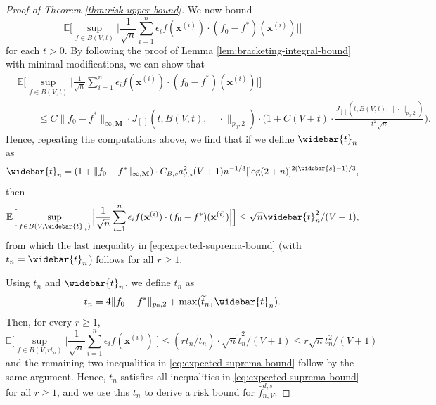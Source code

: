 \documentclass[10pt]{article}
\newcommand{\E}{{\mathbb E}}
\newcommand{\lsefstinf}{{\hat{f}^{d, s}_{n, V}}}
\newcommand{\xbf}{{\mathbf{x}}}
\newcommand{\Mbf}{{\mathbf{M}}}
\begin{document}
\begin{proof}[Proof of Theorem \ref{thm:risk-upper-bound}]
We now bound 
\begin{equation*}
    \E\Big[ \sup_{f \in B(V, t)} \Big| \frac{1}{\sqrt{n}} 
    \sum_{i = 1}^{n} \epsilon_i f(\xbf^{(i)})\cdot 
    (f_0 - f^*)(\xbf^{(i)})\Big|\Big] 
\end{equation*}
for each $t > 0$. By following the proof of Lemma \ref{lem:bracketing-integral-bound} 
with minimal modifications, we can show that
\begin{equation*}
\begin{aligned}
    &\E\Big[ \sup_{f \in B(V, t)} \Big| \frac{1}{\sqrt{n}} 
    \sum_{i = 1}^{n} \epsilon_i f(\xbf^{(i)})\cdot 
    (f_0 - f^*)(\xbf^{(i)})\Big|\Big] \\
    &\qquad\le C \|f_0 - f^*\|_{\infty, \Mbf} \cdot 
    J_{[ \ ]}(t, B(V, t), \| \cdot \|_{p_0, 2}) 
    \cdot \Big(1 + C(V + t) \cdot 
    \frac{J_{[ \ ]}(t, B(V, t), \| \cdot \|_{p_0, 2})}{t^2 \sqrt{n}}\Big).
\end{aligned}
\end{equation*}
Hence, repeating the computations above, we find that if we define  
$\widebar{t}_n$ as
\begin{equation*}
    \widebar{t}_n 
    = (1 + \|f_0 - f^*\|_{\infty, \Mbf}) 
    \cdot C_{B, s} a_{d, s}^2 (V + 1) n^{-1/3}
    [\log(2 + n)]^{2(\widebar{s} - 1)/3},
\end{equation*}
then
\begin{equation*}
    \E\Big[ \sup_{f \in B(V, \widebar{t}_n)} \Big| \frac{1}{\sqrt{n}} 
    \sum_{i = 1}^{n} \epsilon_i f(\xbf^{(i)})\cdot 
    (f_0 - f^*)(\xbf^{(i)})\Big|\Big] 
    \le \sqrt{n} \widebar{t}_n^2 / (V + 1),
\end{equation*}
from which the last inequality in \eqref{eq:expected-suprema-bound} (with $t_n = \widebar{t}_n$) 
follows for all $r \ge 1$.
    
Using $\widetilde{t}_n$ and $\widebar{t}_n$, we define $t_n$ as
\begin{equation*}
    t_n = 4\|f_0 - f^*\|_{p_0, 2} 
    + \max(\widetilde{t}_n, \widebar{t}_n).
\end{equation*}
Then, for every $r \ge 1$, 
\begin{equation*}
    \E\Big[\sup_{f \in B(V, rt_n)} \Big|\frac{1}{\sqrt{n}}
    \sum_{i = 1}^{n} \epsilon_i f(\xbf^{(i)})\Big|\Big]
    \le (rt_n / \widetilde{t}_n) \cdot \sqrt{n} \widetilde{t}_n^2 / (V + 1)
    \le r \sqrt{n} t_n^2 / (V + 1)
\end{equation*}
and the remaining two inequalities in \eqref{eq:expected-suprema-bound} 
follow by the same argument. Hence, $t_n$ satisfies all inequalities in 
\eqref{eq:expected-suprema-bound} for all $r \ge 1$, and we use this $t_n$
to derive a risk bound for $\lsefstinf$.
    

\end{proof}
\end{document}
